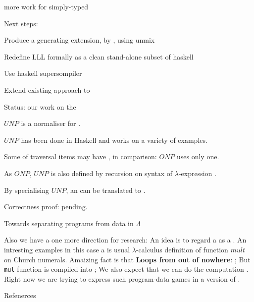 \documentclass[12pt,fleqn,landscape]{article}
\begin{document}
\begin{slide}{more work for simply-typed \lc }

\vair\vair

Next steps:
\vair

  \bi
  \ii Produce a generating extension,  by , using {\sc unmix}
\vair

  \ii Redefine LLL formally as a clean stand-alone subset of {\sc haskell}
\vair

  \ii Use haskell supersompiler
\vair

  \ii Extend existing approach to 
  \ei
\end{slide}




\begin{slide}{Status:  our work on the  \lc }

\be
\ii $UNP$ is a normaliser for .
\vair

\ii $UNP$ has been done in {\sc Haskell} and works on a variety of examples.
\vair

\ii Some of traversal items may have , in comparison: $ONP$ uses only one.
\vair

\ii As $ONP$, $UNP$ is also defined  by recursion on syntax of $\lambda$-expression .
\vair

\ii By specialising $UNP$, an  can be translated to .
\vair

\ii Correctness proof: pending.
\ee

\end{slide}



\begin{slide}{Towards separating programs from data in $\Lambda$}

Also we have a one more direction for research:
\be
\ii An idea is to regard a  as a
  .
\ii An intresting examples in this case a is usual $\lambda$-calculus definition of function $mult$
  on Church numerals.
\ii Amaizing fact is that \textbf{Loops from out of nowhere}:
  \bi
  \ii {};
  \ii But {\tt mul} function is compiled into ;
  \ii We also expect that we can do the computation .
  \ei
\ii Right now we are trying to express such program-data games in a 
  version of . 
\ee

\end{slide}

\begin{slide}{Refenerces}

\end{slide}
\end{document}
